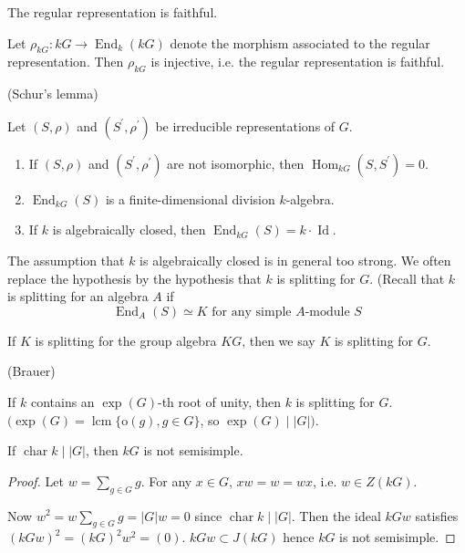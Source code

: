 \documentclass[11pt, a4paper]{report}
\begin{document}
\begin{lemma}
The regular representation is faithful.

Let $\rho_{k G}: k G \rightarrow \operatorname{End}_{k}(k G)$ denote the morphism associated to the regular representation. Then $\rho_{k G}$ is injective, i.e. the regular representation is faithful.
\end{lemma}

\begin{lemma}
(Schur's lemma)

Let $(S, \rho)$ and $\left(S^{\prime}, \rho^{\prime}\right)$ be irreducible representations of $G$.
\begin{enumerate}
\item If $(S, \rho)$ and $\left(S^{\prime}, \rho^{\prime}\right)$ are not isomorphic, then $\operatorname{Hom}_{k G}\left(S, S^{\prime}\right)=0$.
\item $\operatorname{End}_{k G}(S)$ is a finite-dimensional division $k$-algebra.
\item If $k$ is algebraically closed, then $\operatorname{End}_{k G}(S)=k \cdot \operatorname{Id}$.
\end{enumerate}
\end{lemma}

\begin{remark}
The assumption that $k$ is algebraically closed is in general too strong. We often replace the hypothesis by the hypothesis that $k$ is splitting for $G$. (Recall that $k$ is splitting for an algebra $A$ if
\[
\operatorname{End}_{A}(S) \simeq K \text{ for any simple } A\text{-module } S
\]

If $K$ is splitting for the group algebra $KG$, then we say $K$ is splitting for $G$.

\end{remark}

\begin{theorem}
(Brauer)

If $k$ contains an $\exp(G)$-th root of unity, then $k$ is splitting for $G$.
$(\exp(G) = \operatorname{lcm}\{\mathrm{o}(g), g \in G\}$, so $\exp(G) \mid |G|)$.
\end{theorem}

\begin{proposition}
If $\operatorname{char} k \mid |G|$, then $kG$ is not semisimple.
\end{proposition}

\begin{proof}
Let $w = \sum_{g \in G} g$. For any $x \in G$, $xw = w = wx$, i.e. $w \in Z(kG)$.

Now $w^{2} = w \sum_{g \in G} g = |G| w = 0$ since $\operatorname{char} k \mid |G|$. Then the ideal $kGw$ satisfies $(kGw)^{2} = (kG)^{2} w^{2} = (0)$. $kGw \subset J(kG)$ hence $kG$ is not semisimple.
\end{proof}
\end{document}
